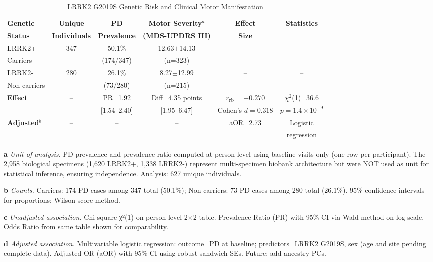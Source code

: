 \documentclass[11pt]{article}
\begin{document}
\begin{table}[ht]
\centering
\caption{LRRK2 G2019S Genetic Risk and Clinical Motor Manifestation}
\label{tab:lrrk2}
\small
\begin{tabular}{lccccc}
\toprule
\textbf{Genetic} & \textbf{Unique} & \textbf{PD} & \textbf{Motor Severity$^a$} & \textbf{Effect} & \textbf{Statistics} \\
\textbf{Status} & \textbf{Individuals} & \textbf{Prevalence} & \textbf{(MDS-UPDRS III)} & \textbf{Size} & \\
\midrule
LRRK2+ & 347 & 50.1\% & 12.63$\pm$14.13 & -- & -- \\
Carriers & & (174/347) & (n=323) & & \\
\midrule
LRRK2- & 280 & 26.1\% & 8.27$\pm$12.99 & -- & -- \\
Non-carriers & & (73/280) & (n=215) & & \\
\midrule
\textbf{Effect} & -- & PR=1.92 & Diff=4.35 points & $r_{\text{rb}}=-0.270$ & $\chi^2$(1)=36.6 \\
& & [1.54--2.40] & [1.95--6.47] & Cohen's $d=0.318$ & $p=1.4\times10^{-9}$ \\
\midrule
\textbf{Adjusted$^b$} & -- & -- & -- & aOR=2.73 & Logistic \\
& & & & & regression \\
\bottomrule
\end{tabular}
\begin{tablenotes}
\footnotesize
\item[\textbf{a}] \textit{Unit of analysis.} PD prevalence and prevalence ratio computed at person level using baseline visits only (one row per participant). The 2,958 biological specimens (1,620 LRRK2+, 1,338 LRRK2-) represent multi-specimen biobank architecture but were NOT used as unit for statistical inference, ensuring independence. Analysis: 627 unique individuals.

\item[\textbf{b}] \textit{Counts.} Carriers: 174 PD cases among 347 total (50.1\%); Non-carriers: 73 PD cases among 280 total (26.1\%). 95\% confidence intervals for proportions: Wilson score method.

\item[\textbf{c}] \textit{Unadjusted association.} Chi-square χ²(1) on person-level 2×2 table. Prevalence Ratio (PR) with 95\% CI via Wald method on log-scale. Odds Ratio from same table shown for comparability.

\item[\textbf{d}] \textit{Adjusted association.} Multivariable logistic regression: outcome=PD at baseline; predictors=LRRK2 G2019S, sex (age and site pending complete data). Adjusted OR (aOR) with 95\% CI using robust sandwich SEs. Future: add ancestry PCs.


\end{tablenotes}
\end{table}
\end{document}
